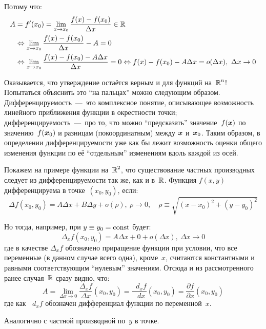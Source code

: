 \documentclass[a4paper,12pt]{article}
\newcommand{\diff}{\mathop{}\!d}
\begin{document}
\begin{solution}
    Потому что:
    \begin{equation*}
    \begin{split}
      A &= f'(x_0) = \lim_{x \to x_0} \frac{f(x) - f(x_0)}{\Delta x} \in \operatorname{\mathbb R}\\
      &\Leftrightarrow \lim_{x \to x_0} \frac{f(x) - f(x_0)}{\Delta x} - A = 0\\
      &\Leftrightarrow \lim_{x \to x_0} \frac{f(x) - f(x_0) - A \Delta x}{\Delta x} = 0
      \Leftrightarrow f(x) - f(x_0) - A \Delta x = o(\Delta x),\ \Delta x \to 0
    \end{split}
    \end{equation*}

    Оказывается, что утверждение остаётся верным и для функций на~$\operatorname{\mathbb R}^n$!
    Попытаться объяснить это ``на пальцах'' можно следующим образом.
    Дифференцируемость~---~это комплексное понятие, описывающее возможность линейного приближения функции в окрестности точки; дифференцируемость~---~про то, что можно ``предсказать'' значение~$f(\boldsymbol x)$ по значению~$f(\boldsymbol x_0)$ и разницам (покоординатным) между $\boldsymbol x$ и~$\boldsymbol x_0$.
    Таким образом, в определении дифференцируемости уже как бы лежит возможность оценки общего изменения функции по её ``отдельным'' изменениям вдоль каждой из осей.

    Покажем на примере функции на~$\operatorname{\mathbb R}^2$, что существование частных производных следует из дифференцируемости так же, как и в~$\operatorname{\mathbb R}$.
    Функция $f(x, y)$ дифференцируема в точке~$(x_0, y_0)$, если:
    \[
      \Delta f(x_0, y_0) = A \Delta x + B \Delta y + o(\rho),\ \rho \to 0,\quad \rho \equiv \sqrt{(x - x_0)^2 + (y - y_0)^2}
    \]

    Но тогда, например, при $y \hm\equiv y_0 \hm= \mathrm{const}$ будет:
    \[
      \Delta_x f(x_0, y_0) = A \Delta x + 0 + o(\Delta x),\ \Delta x \to 0
    \]
    где в качестве $\Delta_x f$ обозначено приращение функции при условии, что все переменные (в данном случае всего одна), кроме~$x$, считаются константными и равными соответствующим ``нулевым'' значениям.
    Отсюда и из рассмотренного ранее случая~$\operatorname{\mathbb R}$ сразу видно, что:
    \[
      A = \lim_{\Delta x \to 0} \frac{\Delta_x f}{\Delta x} (x_0, y_0) = \frac{\diff_x f}{\diff x} (x_0, y_0) = \frac{\partial f}{\partial x}(x_0, y_0)
    \]
    где как $\diff_x f$ обозначен дифференциал функции по переменной~$x$.
    
    Аналогично с частной производной по~$y$ в точке.


\end{solution}
\end{document}
